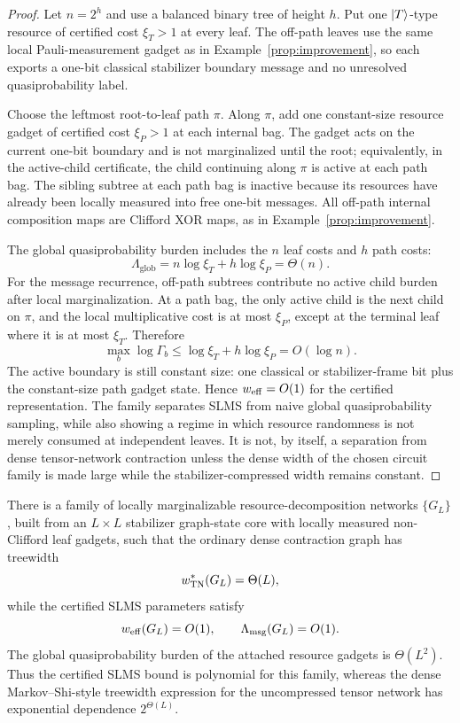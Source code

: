 \begin{proof}
Let \(n=2^h\) and use a balanced binary tree of height \(h\). Put one \(\left|T\right\rangle\)-type resource of certified cost \(\xi_T>1\) at every leaf. The off-path leaves use the same local Pauli-measurement gadget as in Example~\ref{prop:improvement}, so each exports a one-bit classical stabilizer boundary message and no unresolved quasiprobability label.

Choose the leftmost root-to-leaf path \(\pi\). Along \(\pi\), add one constant-size resource gadget of certified cost \(\xi_P>1\) at each internal bag. The gadget acts on the current one-bit boundary and is not marginalized until the root; equivalently, in the active-child certificate, the child continuing along \(\pi\) is active at each path bag. The sibling subtree at each path bag is inactive because its resources have already been locally measured into free one-bit messages. All off-path internal composition maps are Clifford XOR maps, as in Example~\ref{prop:improvement}.

The global quasiprobability burden includes the \(n\) leaf costs and \(h\) path costs:
\[
\Lambda_{\mathrm{glob}}
=n\log\xi_T+h\log\xi_P
=\Theta(n).
\]
For the message recurrence, off-path subtrees contribute no active child burden after local marginalization. At a path bag, the only active child is the next child on \(\pi\), and the local multiplicative cost is at most \(\xi_P\), except at the terminal leaf where it is at most \(\xi_T\). Therefore
\[
\max_b \log\Gamma_b
\le \log\xi_T+h\log\xi_P
=O(\log n).
\]
The active boundary is still constant size: one classical or stabilizer-frame bit plus the constant-size path gadget state. Hence \(w_{\mathrm{eff}}=O(1)\) for the certified representation. The family separates SLMS from naive global quasiprobability sampling, while also showing a regime in which resource randomness is not merely consumed at independent leaves. It is not, by itself, a separation from dense tensor-network contraction unless the dense width of the chosen circuit family is made large while the stabilizer-compressed width remains constant.
\end{proof}

\begin{proposition}
\label{thm:dense-width-separation}
There is a family of locally marginalizable resource-decomposition networks \(\{G_L\}\), built from an \(L\times L\) stabilizer graph-state core with locally measured non-Clifford leaf gadgets, such that the ordinary dense contraction graph has treewidth
\[
w_{\mathrm{TN}}^\ast(G_L)=\Theta(L),
\]
while the certified SLMS parameters satisfy
\[
w_{\mathrm{eff}}(G_L)=O(1),\qquad
\Lambda_{\mathrm{msg}}(G_L)=O(1).
\]
The global quasiprobability burden of the attached resource gadgets is \(\Theta(L^2)\). Thus the certified SLMS bound is polynomial for this family, whereas the dense Markov--Shi-style treewidth expression for the uncompressed tensor network has exponential dependence \(2^{\Theta(L)}\).
\end{proposition}

